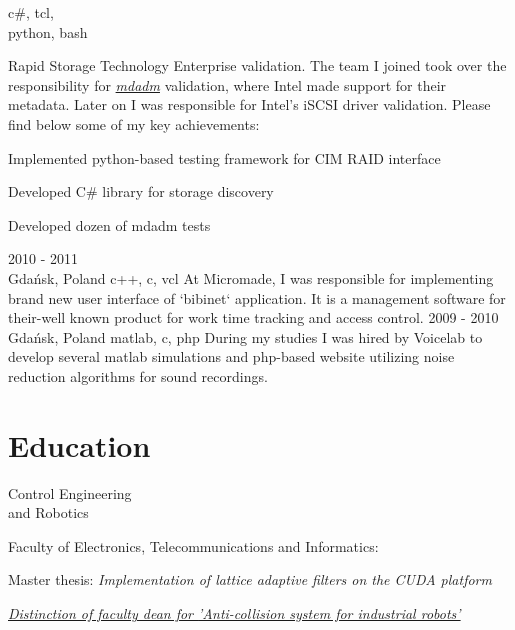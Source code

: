 \documentclass[a4paper,11pt]{cv4tw}%
\begin{document}
      {c\#, tcl,\\python, bash}
      {Rapid Storage Technology Enterprise validation. The team I joined took over the  responsibility
        for \href{https://en.wikipedia.org/wiki/Mdadm}{\emph{mdadm}} validation, where Intel
        made support for their metadata. Later on I was responsible for Intel's iSCSI driver validation.
        Please find below some of my key achievements:
        \begin{missions}
        \item Implemented python-based testing framework for CIM RAID interface
        \item Developed C\# library for storage discovery
        \item Developed dozen of mdadm tests
        \end{missions}
      }
      {2010 - 2011\\Gdańsk, Poland}
      {c++, c, vcl}
      {At Micromade, I was responsible for implementing brand new user interface of `bibinet` application.
        It is a management software for their-well known product for work time tracking and access control.
      }
      {2009 - 2010\\Gdańsk, Poland}
      {matlab, c, php}
      {During my studies I was hired by Voicelab to develop several matlab simulations
        and php-based website utilizing noise reduction algorithms for sound recordings.
      }
\section{Education}
      {Control Engineering\\and Robotics}
      {Faculty of Electronics, Telecommunications and Informatics:
        \begin{missions}
          \item Master thesis: \textit{Implementation of lattice adaptive filters on the CUDA platform}
          \item \href{https://projektgrupowy.eti.pg.gda.pl/editions/2/projects/496/posters/138}{\emph{Distinction of faculty dean for \itshape 'Anti-collision system for industrial robots'}}
        \end{missions}
      }
\end{document}
